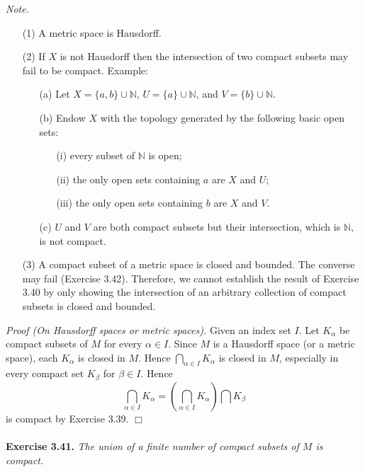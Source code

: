 \documentclass{article}
\begin{document}
\emph{Note.}
\begin{enumerate}
\item[(1)]
A metric space is Hausdorff.
\item[(2)]
If $X$ is not Hausdorff then the intersection of two compact subsets may fail to be compact.
Example:
  \begin{enumerate}
  \item[(a)]
  Let $X = \{ a, b \} \cup \mathbb{N}$,
  $U = \{ a \} \cup \mathbb{N}$,
  and $V = \{ b \} \cup \mathbb{N}$.
  \item[(b)]
  Endow $X$ with the topology generated by the following basic open sets:
    \begin{enumerate}
    \item[(i)]
    every subset of $\mathbb{N}$ is open;
    \item[(ii)]
    the only open sets containing $a$ are $X$ and $U$;
    \item[(iii)]
    the only open sets containing $b$ are $X$ and $V$.
    \end{enumerate}
  \item[(c)]
  $U$ and $V$ are both compact subsets but their intersection,
  which is $\mathbb{N}$, is not compact.
  \end{enumerate}
\item[(3)]
A compact subset of a metric space is closed and bounded.
The converse may fail (Exercise 3.42).
Therefore,
we cannot establish the result of Exercise 3.40
by only showing
the intersection of an arbitrary collection of compact subsets is closed and bounded. \\
\end{enumerate}

\emph{Proof (On Hausdorff spaces or metric spaces).}
Given an index set $I$.
Let $K_\alpha$ be compact subsets of $M$ for every $\alpha \in I$.
Since $M$ is a Hausdorff space (or a metric space),
each $K_\alpha$ is closed in $M$.
Hence
$\bigcap_{\alpha \in I} K_{\alpha}$ is closed in $M$,
especially in every compact set $K_{\beta}$ for $\beta \in I$.
Hence
$$\bigcap_{\alpha \in I} K_{\alpha}
= \left( \bigcap_{\alpha \in I} K_{\alpha} \right) \bigcap K_{\beta}$$
is compact by Exercise 3.39.
$\Box$ \\\\






\textbf{Exercise 3.41.}
\emph{The union of a finite number of compact subsets of $M$ is compact.} \\
\end{document}
